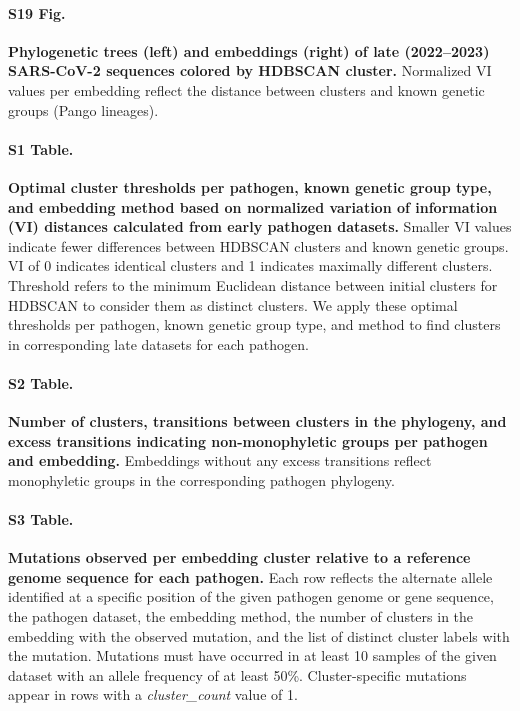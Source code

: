 \documentclass[10pt,letterpaper]{article}
\begin{document}
\paragraph*{S19 Fig.}
\label{S_Fig_sarscov2_late_embeddings_by_cluster_vs_Nextclade_pango}
{\bf Phylogenetic trees (left) and embeddings (right) of late (2022--2023) SARS-CoV-2 sequences colored by HDBSCAN cluster.}
Normalized VI values per embedding reflect the distance between clusters and known genetic groups (Pango lineages).

\paragraph*{S1 Table.}
\label{S_Table_optimal_cluster_parameters}
{\bf Optimal cluster thresholds per pathogen, known genetic group type, and embedding method based on normalized variation of information (VI) distances calculated from early pathogen datasets.}
Smaller VI values indicate fewer differences between HDBSCAN clusters and known genetic groups.
VI of 0 indicates identical clusters and 1 indicates maximally different clusters.
Threshold refers to the minimum Euclidean distance between initial clusters for HDBSCAN to consider them as distinct clusters.
We apply these optimal thresholds per pathogen, known genetic group type, and method to find clusters in corresponding late datasets for each pathogen.

\paragraph*{S2 Table.}
\label{S_Table_monophyletic_clusters}
{\bf Number of clusters, transitions between clusters in the phylogeny, and excess transitions indicating non-monophyletic groups per pathogen and embedding.}
Embeddings without any excess transitions reflect monophyletic groups in the corresponding pathogen phylogeny.

\paragraph*{S3 Table.}
\label{S_Table_mutations_per_cluster}
{\bf Mutations observed per embedding cluster relative to a reference genome sequence for each pathogen.}
Each row reflects the alternate allele identified at a specific position of the given pathogen genome or gene sequence, the pathogen dataset, the embedding method, the number of clusters in the embedding with the observed mutation, and the list of distinct cluster labels with the mutation.
Mutations must have occurred in at least 10 samples of the given dataset with an allele frequency of at least 50\%.
Cluster-specific mutations appear in rows with a \textit{cluster\_count} value of 1.
\end{document}
